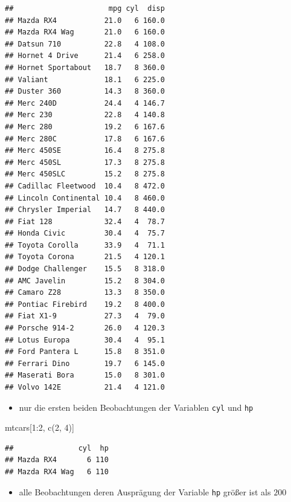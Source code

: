 \documentclass[12pt,a4paper]{article}
\newenvironment{Shaded}{\begin{snugshade}}{\end{snugshade}}
\newcommand{\DecValTok}[1]{\textcolor[rgb]{0.00,0.00,0.81}{#1}}
\newcommand{\FunctionTok}[1]{\textcolor[rgb]{0.00,0.00,0.00}{#1}}
\newcommand{\NormalTok}[1]{#1}
\newcommand{\SpecialCharTok}[1]{\textcolor[rgb]{0.00,0.00,0.00}{#1}}
\begin{document}
\begin{verbatim}
##                      mpg cyl  disp
## Mazda RX4           21.0   6 160.0
## Mazda RX4 Wag       21.0   6 160.0
## Datsun 710          22.8   4 108.0
## Hornet 4 Drive      21.4   6 258.0
## Hornet Sportabout   18.7   8 360.0
## Valiant             18.1   6 225.0
## Duster 360          14.3   8 360.0
## Merc 240D           24.4   4 146.7
## Merc 230            22.8   4 140.8
## Merc 280            19.2   6 167.6
## Merc 280C           17.8   6 167.6
## Merc 450SE          16.4   8 275.8
## Merc 450SL          17.3   8 275.8
## Merc 450SLC         15.2   8 275.8
## Cadillac Fleetwood  10.4   8 472.0
## Lincoln Continental 10.4   8 460.0
## Chrysler Imperial   14.7   8 440.0
## Fiat 128            32.4   4  78.7
## Honda Civic         30.4   4  75.7
## Toyota Corolla      33.9   4  71.1
## Toyota Corona       21.5   4 120.1
## Dodge Challenger    15.5   8 318.0
## AMC Javelin         15.2   8 304.0
## Camaro Z28          13.3   8 350.0
## Pontiac Firebird    19.2   8 400.0
## Fiat X1-9           27.3   4  79.0
## Porsche 914-2       26.0   4 120.3
## Lotus Europa        30.4   4  95.1
## Ford Pantera L      15.8   8 351.0
## Ferrari Dino        19.7   6 145.0
## Maserati Bora       15.0   8 301.0
## Volvo 142E          21.4   4 121.0
\end{verbatim}

\begin{itemize}
  \item nur die ersten beiden Beobachtungen der Variablen \texttt{cyl} und \texttt{hp}
\end{itemize}

\begin{Shaded}
\begin{Highlighting}[]
\NormalTok{    mtcars[}\DecValTok{1}\SpecialCharTok{:}\DecValTok{2}\NormalTok{, }\FunctionTok{c}\NormalTok{(}\DecValTok{2}\NormalTok{, }\DecValTok{4}\NormalTok{)]}
\end{Highlighting}
\end{Shaded}

\begin{verbatim}
##               cyl  hp
## Mazda RX4       6 110
## Mazda RX4 Wag   6 110
\end{verbatim}

\begin{itemize}
  \item alle Beobachtungen deren Ausprägung der Variable \texttt{hp} größer ist als $200$
\end{itemize}
\end{document}
